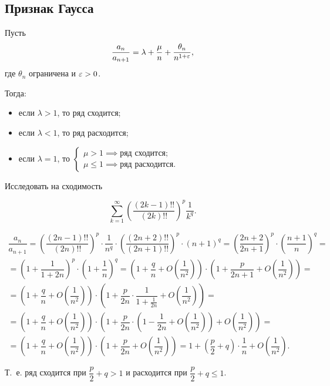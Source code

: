 \documentclass[../../main.tex]{subfiles}
\begin{document}
\subsection{Признак Гаусса}

\begin{thm}
Пусть \[\dfrac{a_n}{a_{n+1}} = \lambda + \dfrac{\mu}{n} +
\dfrac{\theta_n}{n^{1 + \varepsilon}},\]
где $\theta_n$ ограничена и $\varepsilon > 0$.

Тогда:
\begin{itemize}
	 \item если $\lambda > 1$, то ряд сходится;
	 \item если $\lambda < 1$, то ряд расходится;
	 \item если $\lambda = 1$, то
	 $\begin{cases}
	 	\mu > 1 \implies \text{ряд сходится;}\\
	 	\mu \leq 1 \implies \text{ряд расходится.} 
	 \end{cases}$
\end{itemize}
\end{thm}

\begin{example} Исследовать на сходимость

\[\sum\limits_{k = 1}^{\infty}\left(\dfrac{(2k - 1)!!}{(2k)!!} \right)^p
\dfrac{1}{k^q}.\]

\begin{gather*}
\dfrac{a_{n}}{a_{n + 1}} = \left(\dfrac{(2n - 1)!!}{(2n)!!}\right)^p \cdot
\dfrac{1}{n^q} \cdot\left( \dfrac{(2n + 2)!!}{(2n + 1)!!}\right)^p \cdot
(n + 1)^q = \left(\dfrac{2n + 2}{2n + 1}\right)^p \cdot
\left(\dfrac{n+1}{n}\right)^q = 
\\
= \left(1 + \dfrac{1}{1 + 2n}\right)^p \cdot
\left(1 + \dfrac{1}{n}\right)^q
= \left(1 + \dfrac{q}{n} + O\left(\dfrac{1}{n^2}\right)\right) \cdot
\left(1 + \dfrac{p}{2n + 1} + O\left(\dfrac{1}{n^2}\right)\right) =
\\
=
\left(1 + \dfrac{q}{n} + O\left(\dfrac{1}{n^2}\right)\right) \cdot
\left(1 + \dfrac{p}{2n} \cdot \dfrac{1}{1 + \frac{1}{2n}}
+ O\left(\dfrac{1}{n^2}\right)\right) =
\\
= \left(1 + \dfrac{q}{n} + O\left(\dfrac{1}{n^2}\right)\right) \cdot \left(1 +
\dfrac{p}{2n} \cdot \left(1 - \dfrac{1}{2n} + O\left(\dfrac{1}{n^2}
\right)\right) + O\left(\dfrac{1}{n^2}\right) \right) =
\\
= \left(1 + \dfrac{q}{n} + O\left(\dfrac{1}{n^2}\right)\right) \cdot \left(1 +
\dfrac{p}{2n} + O\left(\dfrac{1}{n^2}\right)\right) = 1 + \left(\dfrac{p}{2} +
q \right) \cdot \dfrac{1}{n} + O\left(\dfrac{1}{n^2}\right).
\end{gather*}

Т.~е. ряд сходится при $\dfrac{p}{2} + q > 1$ и
расходится при $\dfrac{p}{2} + q \leq 1$.
\end{example}
\end{document}
